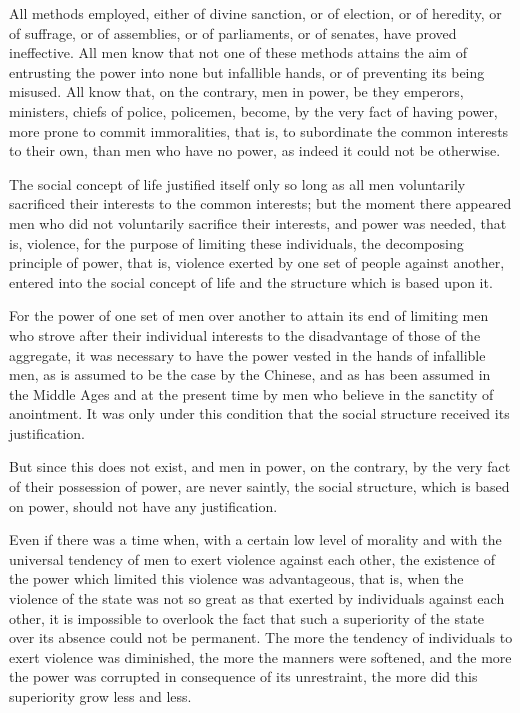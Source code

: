 \documentclass{book}
\begin{document}
All methods employed, either of divine sanction, or of election, or of heredity, or of suffrage, or of assemblies, or of parliaments, or of senates, have proved ineffective. All men know that not one of these methods attains the aim of entrusting the power into none but infallible hands, or of preventing its being misused. All know that, on the contrary, men in power, be they emperors, ministers, chiefs of police, policemen, become, by the very fact of having power, more prone to commit immoralities, that is, to subordinate the common interests to their own, than men who have no power, as indeed it could not be otherwise.

The social concept of life justified itself only so long as all men voluntarily sacrificed their interests to the common interests; but the moment there appeared men who did not voluntarily sacrifice their interests, and power was needed, that is, violence, for the purpose of limiting these individuals, the decomposing principle of power, that is, violence exerted by one set of people against another, entered into the social concept of life and the structure which is based upon it.

For the power of one set of men over another to attain its end of limiting men who strove after their individual interests to the disadvantage of those of the aggregate, it was necessary to have the power vested in the hands of infallible men, as is assumed to be the case by the Chinese, and as has been assumed in the Middle Ages and at the present time by men who believe in the sanctity of anointment. It was only under this condition that the social structure received its justification.

But since this does not exist, and men in power, on the contrary, by the very fact of their possession of power, are never saintly, the social structure, which is based on power, should not have any justification.

Even if there was a time when, with a certain low level of morality and with the universal tendency of men to exert violence against each other, the existence of the power which limited this violence was advantageous, that is, when the violence of the state was not so great as that exerted by individuals against each other, it is impossible to overlook the fact that such a superiority of the state over its absence could not be permanent. The more the tendency of individuals to exert violence was diminished, the more the manners were softened, and the more the power was corrupted in consequence of its unrestraint, the more did this superiority grow less and less.
\end{document}
